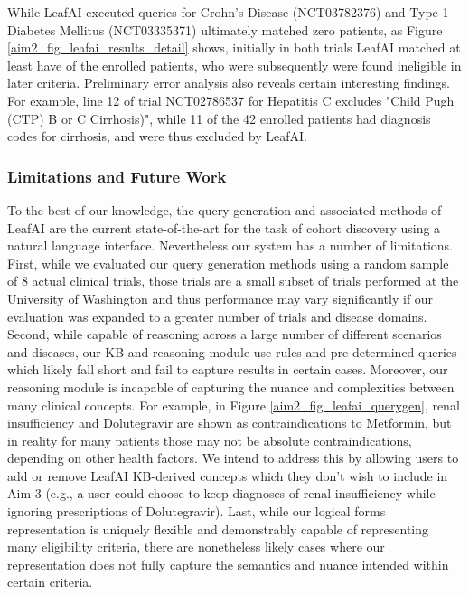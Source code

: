 \documentclass[../main.tex]{subfiles}
\begin{document}
While LeafAI executed queries for Crohn's Disease (NCT03782376) and Type 1 Diabetes Mellitus (NCT03335371) ultimately matched zero patients, as Figure \ref{aim2_fig_leafai_results_detail} shows, initially in both trials LeafAI matched at least have of the enrolled patients, who were subsequently were found ineligible in later criteria. Preliminary error analysis also reveals certain interesting findings. For example, line 12 of trial NCT02786537 for Hepatitis C excludes "Child Pugh (CTP) B or C Cirrhosis)", while 11 of the 42 enrolled patients had diagnosis codes for cirrhosis, and were thus excluded by LeafAI.

\subsubsection{Limitations and Future Work}

To the best of our knowledge, the query generation and associated methods of LeafAI are the current state-of-the-art for the task of cohort discovery using a natural language interface. Nevertheless our system has a number of limitations. First, while we evaluated our query generation methods using a random sample of 8 actual clinical trials, those trials are a small subset of trials performed at the University of Washington and thus performance may vary significantly if our evaluation was expanded to a greater number of trials and disease domains. Second, while capable of reasoning across a large number of different scenarios and diseases, our KB and reasoning module use rules and pre-determined queries which likely fall short and fail to capture results in certain cases. Moreover, our reasoning module is incapable of capturing the nuance and complexities between many clinical concepts. For example, in Figure \ref{aim2_fig_leafai_querygen}, renal insufficiency and Dolutegravir are shown as contraindications to Metformin, but in reality for many patients those may not be absolute contraindications, depending on other health factors. We intend to address this by allowing users to add or remove LeafAI KB-derived concepts which they don't wish to include in Aim 3 (e.g., a user could choose to keep diagnoses of renal insufficiency while ignoring prescriptions of Dolutegravir). Last, while our logical forms representation is uniquely flexible and demonstrably capable of representing many eligibility criteria, there are nonetheless likely cases where our representation does not fully capture the semantics and nuance intended within certain criteria.
\end{document}
